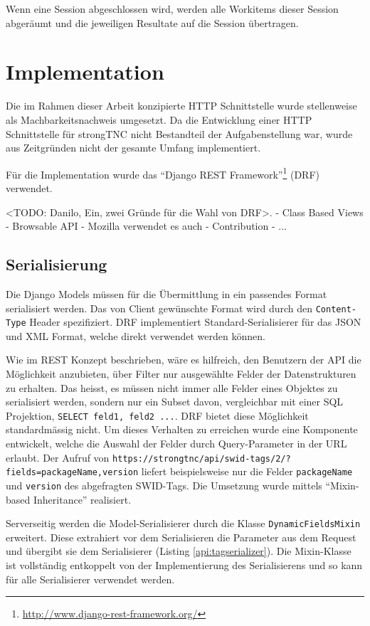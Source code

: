 Wenn eine Session abgeschlossen wird, werden alle Workitems dieser Session
abgeräumt und die jeweiligen Resultate auf die Session übertragen.

\section{Implementation}
Die im Rahmen dieser Arbeit konzipierte HTTP Schnittstelle wurde stellenweise
als Machbarkeitsnachweis umgesetzt. Da die Entwicklung einer HTTP Schnittstelle
für strongTNC nicht Bestandteil der Aufgabenstellung war, wurde aus Zeitgründen
nicht der gesamte Umfang implementiert.

Für die Implementation wurde das \enquote{Django REST
Framework}\footnote{\url{http://www.django-rest-framework.org/}} (DRF)
verwendet.

<TODO: Danilo, Ein, zwei Gründe für die Wahl von DRF>.
- Class Based Views
- Browsable API
- Mozilla verwendet es auch
- Contribution
- ...

\subsection{Serialisierung}
\label{api:serialisierung}
Die Django Models müssen für die Übermittlung in ein passendes Format
serialisiert werden. Das von Client gewünschte Format wird durch den
\texttt{Content-Type} Header spezifiziert. DRF implementiert
Standard-Serialisierer für das JSON und XML Format, welche direkt verwendet
werden können.

Wie im REST Konzept beschrieben, wäre es hilfreich, den
Benutzern der API die Möglichkeit anzubieten, über Filter nur ausgewählte Felder
der Datenstrukturen zu erhalten. Das heisst, es müssen nicht immer alle Felder
eines Objektes zu serialisiert werden, sondern nur ein Subset davon,
vergleichbar mit einer SQL Projektion, \texttt{SELECT feld1, feld2 ...}. DRF
bietet diese Möglichkeit standardmässig nicht. Um dieses Verhalten zu erreichen
wurde eine Komponente entwickelt, welche die Auswahl der Felder durch
Query-Parameter in der URL erlaubt. Der Aufruf von
\texttt{https://strongtnc/api/swid-tags/2/?fields=packageName,version} liefert
beispielsweise nur die Felder \texttt{packageName} und \texttt{version} des
abgefragten SWID-Tags. Die Umsetzung wurde mittels \enquote{Mixin-based
Inheritance}\cite{bracha1990mixin} realisiert.

Serverseitig werden die Model-Serialisierer durch die Klasse
\texttt{DynamicFieldsMixin} erweitert. Diese extrahiert vor dem Serialisieren
die Parameter aus dem Request und übergibt sie dem Serialisierer (Listing
\ref{api:tagserializer}). Die Mixin-Klasse ist vollständig entkoppelt von der
Implementierung des Serialisierens und so kann für alle Serialisierer verwendet
werden.

